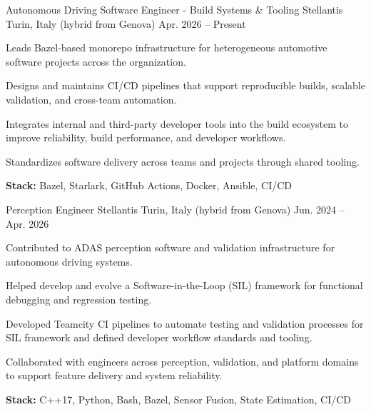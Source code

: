 
\begin{cventries}

  \cventry
  {Autonomous Driving Software Engineer - Build Systems \& Tooling}
  {Stellantis}
  {Turin, Italy (hybrid from Genova)}
  {Apr. 2026 -- Present}
  {
    \begin{cvitems}
    \item {Leads Bazel-based monorepo infrastructure for heterogeneous automotive software projects across the organization.}
    \item {Designs and maintains CI/CD pipelines that support reproducible builds, scalable validation, and cross-team automation.}
    \item {Integrates internal and third-party developer tools into the build ecosystem to improve reliability, build performance, and developer workflows.}
    \item {Standardizes software delivery across teams and projects through shared tooling.}
    \item {\textbf{Stack:} Bazel, Starlark, GitHub Actions, Docker, Ansible, CI/CD}
    \end{cvitems}
  }


  \cventry
  {Perception Engineer}
  {Stellantis}
  {Turin, Italy (hybrid from Genova)}
  {Jun. 2024 -- Apr. 2026}
  {
    \begin{cvitems}
    \item {Contributed to ADAS perception software and validation infrastructure for autonomous driving systems.}
    \item {Helped develop and evolve a Software-in-the-Loop (SIL) framework for functional debugging and regression testing.}
    \item {Developed Teamcity CI pipelines to automate testing and validation processes for SIL framework and defined developer workflow standards and tooling.}
    \item {Collaborated with engineers across perception, validation, and platform domains to support feature delivery and system reliability.}
    \item {\textbf{Stack:} C++17, Python, Bash, Bazel, Sensor Fusion, State Estimation, CI/CD}
    \end{cvitems}
  }



\end{cventries}
